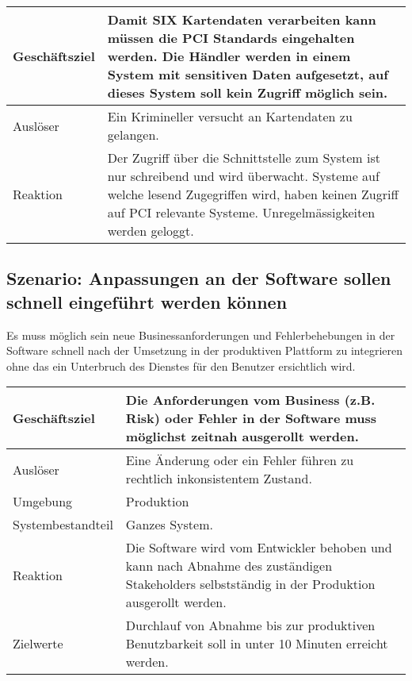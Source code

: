 \begin{table}[H]
	\centering
	\begin{tabular}{ | p{3cm} | p{11cm} | }
		\toprule
		Geschäftsziel & Damit SIX Kartendaten verarbeiten kann müssen die PCI Standards eingehalten werden. Die Händler werden in einem System mit sensitiven Daten aufgesetzt, auf dieses System soll kein Zugriff möglich sein. \\ \hline
		Auslöser & Ein Krimineller versucht an Kartendaten zu gelangen. \\ \hline
		Reaktion & Der Zugriff über die Schnittstelle zum System ist nur schreibend und wird überwacht. Systeme auf welche lesend Zugegriffen wird, haben keinen Zugriff auf PCI relevante Systeme. Unregelmässigkeiten werden geloggt. \\
		\bottomrule
	\end{tabular}
\end{table}

\subsection{Szenario: Anpassungen an der Software sollen schnell eingeführt werden können}

Es muss möglich sein neue Businessanforderungen und Fehlerbehebungen in der Software schnell nach der Umsetzung in der produktiven Plattform zu integrieren ohne das ein Unterbruch des Dienstes für den Benutzer ersichtlich wird.

\begin{table}[H]
	\centering
	\begin{tabular}{ | p{3cm} | p{11cm} | }
		\toprule
		Geschäftsziel & Die Anforderungen vom Business (z.B. Risk) oder Fehler in der Software muss möglichst zeitnah ausgerollt werden. \\ \hline
		Auslöser & Eine Änderung oder ein Fehler führen zu rechtlich inkonsistentem Zustand. \\ \hline
		Umgebung & Produktion\\ \hline
		Systembestandteil & Ganzes System. \\ \hline
		Reaktion & Die Software wird vom Entwickler behoben und kann nach Abnahme des zuständigen Stakeholders selbstständig in der Produktion ausgerollt werden. \\ \hline
		Zielwerte & Durchlauf von Abnahme bis zur produktiven Benutzbarkeit soll in unter 10 Minuten erreicht werden.\\
		\bottomrule
	\end{tabular}
\end{table}

